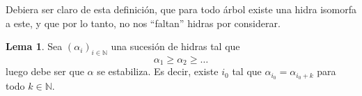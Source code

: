 \documentclass[a4paper,11pt]{article}
\newcommand{\matN}{\mathbb{N}}
\newcommand{\lag}{\langle}
\newcommand{\rag}{\rangle}
\theoremstyle{definition}
\newtheorem{lemma}{Lema}
\begin{document}
Debiera ser claro de esta definición, que para todo árbol existe
una hidra isomorfa a este, y que por lo tanto, no nos ``faltan'' hidras por
considerar.
\begin{comment}
\begin{lemma}
  Si $\alpha$ y $\beta$ son hidras tal que $h(\alpha) < h(\beta)$, entonces
  $\alpha < \beta$.
\end{lemma}
\begin{proof}
  Procedemos por inducción sobre $h(\alpha)$.\\
  $h(\alpha) = 1 \Rightarrow \alpha = \lag\rag$ y el lema se cumple. Asuma
  $h(\alpha) > 1$ y que el lema se cumple para $h(\alpha)-1$. Luego
  $\alpha = \lag a_1,\dots,a_p\rag$ y $\beta = \lag b_1,\dots,b_q\rag$, donde
  por definición de altura es claro que $h(a_1) = h(\alpha)-1 < h(\beta)-1 = h(b_1)$ y por
  lo tanto, por hipótesis de inducción $a_1 < b_1 \Rightarrow \alpha < \beta$.
\end{proof}
\end{comment}
\begin{lemma}
  Sea $(\alpha_i)_{i \in \matN}$ una sucesión de hidras tal que
  $$
  \alpha_1 \geq \alpha_2 \geq \dots
  $$
  luego debe ser que $\alpha$ se estabiliza. Es decir, existe $i_0$ tal
  que $\alpha_{i_0} = \alpha_{i_0 + k}$ para todo $k \in \matN$.
\end{lemma}
\end{document}
